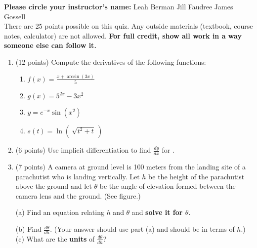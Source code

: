 \documentclass[12pt]{article}
\renewcommand{\emph}[1]{\textsf{\textbf{#1}}}
\begin{document}
\emph{Please circle your instructor's name:} \hfill Leah Berman  \hfill   Jill Faudree \hfill James Gossell \\

There are 25 points possible on this quiz. Any outside materials (textbook, course notes, calculator) are not allowed.  \emph{For full credit, show all work in a way someone else can follow it.} 
\begin{enumerate}
\item (12 points) Compute the derivatives of the following functions:
	\begin{enumerate}
	\item $\displaystyle f(x)=\frac{x+\arcsin(3x)}{5}$
	\vfill
	\item $\displaystyle g(x) = 5^{2x}-3x^2$
	\vfill
	\item $\displaystyle y = e^{-x}\sin(x^2)$
	\vfill 
	\item $s(t) = \ln\left( \: \sqrt{t^2+t} \:\right)$
	\vfill
	\end{enumerate}
\newpage
\item (6 points) Use implicit differentiation to find $\displaystyle \frac{dy}{dx}$ for .

\vspace{3in}

\item (7 points)
 A camera at ground level is 100 meters from the landing site of a parachutist who is landing vertically. Let $h$ be the height of the parachutist above the ground and let $\theta$ be the angle of elevation formed between the camera lens and the ground. (See figure.)

\begin{multicols}{2}

(a) Find an equation relating $h$ and $\theta$ and \textbf{solve it for $\theta.$}
\end{multicols}


	(b) Find $\displaystyle \frac{ d\theta}{dh}.$ (Your answer should use part (a) and should be in terms of $h$.)
	\vfill
	(c) What are the \textbf{units} of $\frac{d\theta}{dh}$?
\vspace{.3in}
\end{enumerate}
\end{document}
